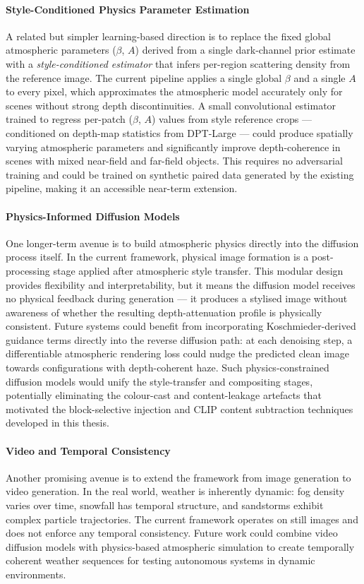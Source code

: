 \paragraph{Style-Conditioned Physics Parameter Estimation}
A related but simpler learning-based direction is to replace the fixed global atmospheric parameters ($\beta$, $A$) derived from a single dark-channel prior estimate with a \emph{style-conditioned estimator} that infers per-region scattering density from the reference image. The current pipeline applies a single global $\beta$ and a single $A$ to every pixel, which approximates the atmospheric model accurately only for scenes without strong depth discontinuities. A small convolutional estimator trained to regress per-patch ($\beta$, $A$) values from style reference crops --- conditioned on depth-map statistics from DPT-Large --- could produce spatially varying atmospheric parameters and significantly improve depth-coherence in scenes with mixed near-field and far-field objects. This requires no adversarial training and could be trained on synthetic paired data generated by the existing pipeline, making it an accessible near-term extension.

\paragraph{Physics-Informed Diffusion Models}
One longer-term avenue is to build atmospheric physics directly into the diffusion process itself. In the current framework, physical image formation is a post-processing stage applied after atmospheric style transfer. This modular design provides flexibility and interpretability, but it means the diffusion model receives no physical feedback during generation --- it produces a stylised image without awareness of whether the resulting depth-attenuation profile is physically consistent. Future systems could benefit from incorporating Koschmieder-derived guidance terms directly into the reverse diffusion path: at each denoising step, a differentiable atmospheric rendering loss could nudge the predicted clean image towards configurations with depth-coherent haze. Such physics-constrained diffusion models would unify the style-transfer and compositing stages, potentially eliminating the colour-cast and content-leakage artefacts that motivated the block-selective injection and CLIP content subtraction techniques developed in this thesis.

\paragraph{Video and Temporal Consistency}
Another promising avenue is to extend the framework from image generation to video generation. In the real world, weather is inherently dynamic: fog density varies over time, snowfall has temporal structure, and sandstorms exhibit complex particle trajectories. The current framework operates on still images and does not enforce any temporal consistency. Future work could combine video diffusion models with physics-based atmospheric simulation to create temporally coherent weather sequences for testing autonomous systems in dynamic environments.

